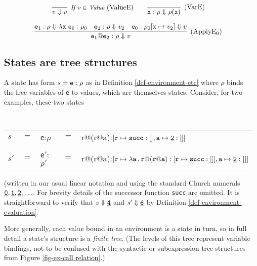 \documentclass{LMCS}
\newcommand{\fl}{\noindent}
\newcommand{\bt}{\begin{tabular}}
\newcommand{\et}{\end{tabular}}
\theoremstyle{definition}\newtheorem{env}[thm]{Environment}
\begin{document}
$$
\infer[\mbox{{\it {\small If v $\in$ Value}}\ }(\textnormal{ValueE})]{v\Downarrow v}{}
\qquad
\infer[(\textnormal{VarE})]{{\tt x} :\rho\Downarrow\rho({\tt x})}{}
$$

$$
\infer[(\textnormal{ApplyE$_0$})]{{\tt e}_1{\tt@e}_2:\rho\Downarrow v}
{{\tt e}_1:\rho\Downarrow \lambda{\tt x.e}_0:\rho_0
 & 
   {\tt e}_2:\rho\Downarrow v_2
&
  {\tt e}_0:\rho_0[{\tt x}\mapsto v_2]\Downarrow v}
$$
\smallskip



\subsection{States are tree structures}

A state has form $s={\tt e:} \ \rho$ as in Definition 
\ref{def-environment-etc} where $\rho$ binds the free variables of 
{\tt e} to values, which are themselves states. 
Consider, for two examples,  these two states
\medskip

{\tt
\bt{lclcl}
$s$ & $=$ & {\tt e}:$\rho$ & $=$ & r@(r@a):$
  [{\tt  r}\mapsto{\tt succ:[]},
   {\tt  a}\mapsto{\tt \underline{2}}:[]]$ \\\\
$s'$ & $=$ & {\tt e}$'$:$\rho'$ & $=$ & r@(r@a):$
  [{\tt  r}\mapsto\lambda{\tt a\,.\,}{\tt r@(r@a)}:[{\tt  r}\mapsto{\tt 
  succ:[]}],
   {\tt  a}\mapsto{\tt \underline{2}}:[]]$ \\
\et
}
\medskip

\fl(written in our usual linear notation
and using the standard Church numerals 
${\tt \underline{0}},{\tt \underline{1}},{\tt \underline{2}},\ldots$. For brevity details of the successor 
function {\tt succ} are omitted.
It is straightforward to verify  that 
$s\Downarrow {\tt \underline{4}}$ and
$s'\Downarrow {\tt \underline{6}}$ by Definition \ref{def-environment-evaluation}.


More generally, each value bound in an environment is a state in turn, so in full 
detail a state's structure  is 
a {\em finite tree}. (The levels of this tree represent variable 
bindings, not to be confused with the syntactic or subexpression
tree structures from 
Figure \ref{fig-ex-call relation}.)
\end{document}
